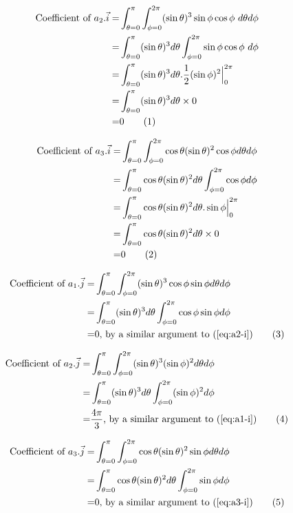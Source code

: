 \documentclass[]{article}
\newcommand\numberthis{\addtocounter{equation}{1}\tag{\theequation}}
\begin{document}
\begin{align*}
\text{Coefficient of }a_2.\vec{i} =&\int_{\theta=0}^{\pi}\int_{\phi=0}^{2\pi}(\sin\theta)^3\sin\phi\cos\phi\ d\theta d\phi\\=&\int_{\theta=0}^{\pi}(\sin\theta)^3d\theta\int_{\phi=0}^{2\pi}\sin\phi\cos\phi\  d\phi\\
=&\int_{\theta=0}^{\pi}(\sin\theta)^3d\theta . \frac{1}{2} (\sin \phi)^2 \Big|_0^{2\pi} \\
=&\int_{\theta=0}^{\pi}(\sin\theta)^3d\theta\times 0\\
=&0 \numberthis \label{eq:a2-i}
\end{align*}

\begin{align*}
\text{Coefficient of }a_3.\vec{i} =&\int_{\theta=0}^{\pi}\int_{\phi=0}^{2\pi}\cos\theta(\sin\theta)^2\cos\phi d\theta d\phi\\=&\int_{\theta=0}^{\pi}\cos\theta(\sin\theta)^2d\theta\int_{\phi=0}^{2\pi}\cos\phi  d\phi\\
=&\int_{\theta=0}^{\pi}\cos\theta(\sin\theta)^2d\theta . \sin\phi \Big|_0^{2\pi}\\
=&\int_{\theta=0}^{\pi}\cos\theta(\sin\theta)^2d\theta \times 0\\
=&0 \numberthis \label{eq:a3-i}
\end{align*}

\begin{align*}
\text{Coefficient of }a_1.\vec{j} =&\int_{\theta=0}^{\pi}\int_{\phi=0}^{2\pi}(\sin\theta)^3\cos\phi\sin\phi d\theta d\phi\\=&\int_{\theta=0}^{\pi}(\sin\theta)^3d\theta\int_{\phi=0}^{2\pi}\cos\phi\sin\phi  d\phi\\
=&0 \text{, by a similar argument to (\ref{eq:a2-i})}\numberthis \label{eq:a1-j}
\end{align*}

\begin{align*}
\text{Coefficient of }a_2.\vec{j} =&\int_{\theta=0}^{\pi}\int_{\phi=0}^{2\pi}(\sin\theta)^3(\sin\phi)^2 d\theta d\phi\\=&\int_{\theta=0}^{\pi}(\sin\theta)^3 d\theta \int_{\phi=0}^{2\pi}(\sin\phi)^2  d\phi\\
=& \frac{4\pi}{3} \text{, by a similar argument to (\ref{eq:a1-i})} \numberthis \label{eq:a2-j}
\end{align*}

\begin{align*}
\text{Coefficient of }a_3.\vec{j} =&\int_{\theta=0}^{\pi}\int_{\phi=0}^{2\pi}\cos\theta(\sin\theta)^2\sin\phi  d\theta d\phi\\=&\int_{\theta=0}^{\pi}\cos\theta(\sin\theta)^2d\theta\int_{\phi=0}^{2\pi}\sin\phi   d\phi\\=&0 \text{, by a similar argument to (\ref{eq:a3-i})} \numberthis \label{eq:a3-j}
\end{align*}
\end{document}
